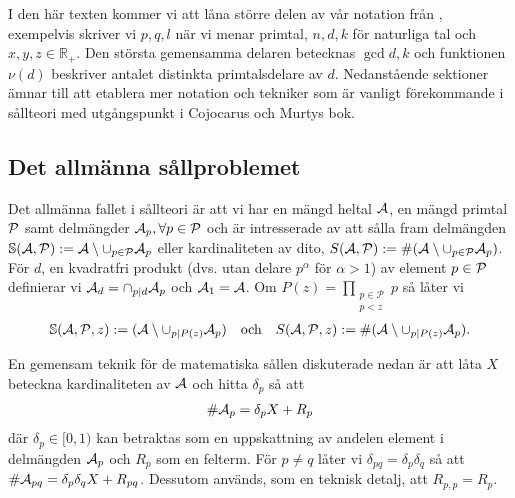 
I den här texten kommer vi att låna större delen av vår notation från \cite{cojocarumurty}, exempelvis skriver vi \(p, q, l\) när vi menar primtal, \(n, d, k\) för naturliga tal och \(x, y, z \in \mathbb{R}_+\). Den största gemensamma delaren betecknas \(\gcd{d, k}\) och funktionen \(\nu(d)\) beskriver antalet distinkta primtalsdelare av \(d\). Nedanstående sektioner ämnar till att etablera mer notation och tekniker som är vanligt förekommande i sållteori med utgångspunkt i Cojocarus och Murtys bok.


\subsection{Det allmänna sållproblemet}
Det allmänna fallet i sållteori är att vi har en mängd heltal \(\A\), en mängd primtal \(\P\) samt delmängder \(\A_p, \forall p \in \P\) och är intresserade av att sålla fram delmängden \(\mathbb{S}(\A, \P) := \A \setminus \cup_{p \in \P} \A_p\) eller kardinaliteten av dito, \(S(\A, \P) :=\card{(\A \setminus \cup_{p \in \P} \A_p)}\). För \(d\), en kvadratfri produkt (dvs. utan delare \(p^\alpha\) för \(\alpha > 1\)) av element \(p \in \P\) definierar vi \(\A_d = \cap_{p \divides d} \A_p\) och \(\A_1 = \A\). Om \(P(z) = \prod_{\substack{p\in \mathcal{P} \\ p < z}} p\) så låter vi
\begin{align*}
    \mathbb{S}(\A, \P, z) := (\A \setminus \cup_{p \divides P(z)} \A_p)
    \quad \text{och} \quad
    \S{A}{P}{z} := \card{(\A \setminus \cup_{p \divides P(z)} \A_p)} .
\end{align*}

En gemensam teknik för de matematiska sållen diskuterade nedan är att låta \(X\) beteckna kardinaliteten av \(\A\) och hitta \(\delta_p\) så att
\begin{align*}
    \card{\A_p} = \delta_p X + R_p
\end{align*}
där \(\delta_p \in [0, 1)\) kan betraktas som en uppskattning av andelen element i delmängden \(\A_p\) och \(R_p\) som en felterm. För \(p \neq q\) låter vi \(\delta_{pq} = \delta_p \delta_q\) så att \(\card{\A_{pq}} = \delta_p \delta_q X + R_{pq}\). Dessutom används, som en teknisk detalj, att \(R_{p,p} = R_p\).


